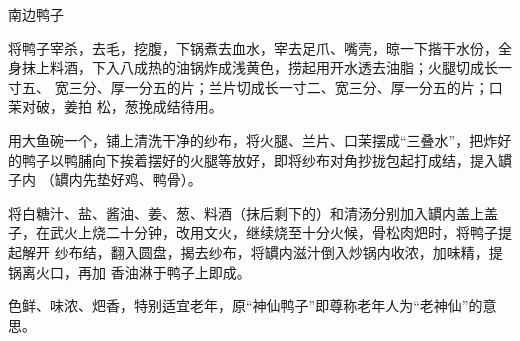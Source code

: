 \begin{recipe}[神仙鸭子]{南边鸭子}

\ingredients


\preparation

\step 将鸭子宰杀，去毛，挖腹，下锅煮去血水，宰去足爪、嘴壳，晾一下揩干水份，全
身抹上料酒，下入八成热的油锅炸成浅黄色，捞起用开水透去油脂；火腿切成长一寸五、
宽三分、厚一分五的片；兰片切成长一寸二、宽三分、厚一分五的片；口茉对破，姜拍
松，葱挽成结待用。

\step 用大鱼碗一个，铺上清洗干净的纱布，将火腿、兰片、口茉摆成“三叠水”，把炸好
的鸭子以鸭脯向下挨着摆好的火腿等放好，即将纱布对角抄拢包起打成结，提入罆子内
（罆内先垫好鸡、鸭骨）。

\step 将白糖汁、盐、酱油、姜、葱、料酒（抹后剩下的）和清汤分别加入罆内盖上盖
子，在武火上烧二十分钟，改用文火，继续烧至十分火候，骨松肉𤆵时，将鸭子提起解开
纱布结，翻入圆盘，揭去纱布，将罆内滋汁倒入炒锅内收浓，加味精，提锅离火口，再加
香油淋于鸭子上即成。

\features

色鲜、味浓、𤆵香，特别适宜老年，原“神仙鸭子”即尊称老年人为“老神仙”的意思。

\end{recipe}

